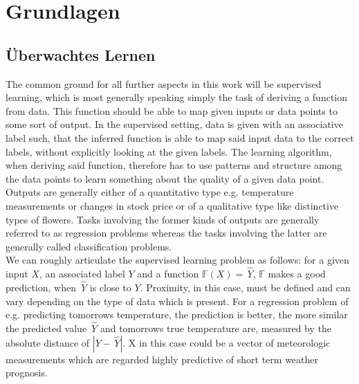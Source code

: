 
\section{Grundlagen}
\subsection{Überwachtes Lernen}
\newcommand\yhat{\,\hat{y}}
\newcommand\Yhat{\, \hat{Y}}

The common ground for all further aspects in this work will be supervised learning, which is most generally speaking simply the task of deriving a function from data. This function should be able to map given inputs or data points to some sort of output. In the supervised setting, data is given with an associative label such, that the inferred function is able to map said input data to the correct labels, without explicitly looking at the given labels. The learning algorithm, when deriving said function, therefore has to use patterns and structure among the data points to learn something about the quality of a given data point. Outputs are generally either of a quantitative type e.g. temperature measurements or changes in stock price or of a qualitative type like distinctive types of flowers. Tasks involving the former kinds of outputs are generally referred to as regression problems whereas the tasks involving the latter are generally called classification problems.
\\We can roughly articulate the supervised learning problem as follows: for a given input $X$, an associated label $Y$ and a function $ \mathbb{F}(X)= \Yhat$, $\mathbb{F}$ makes a good prediction, when $\Yhat$ is close to $Y$. Proximity, in this case, must be defined and can vary depending on the type of data which is present. For a regression problem of e.g. predicting tomorrows temperature, the prediction is better, the more similar the predicted value $\Yhat$ and tomorrows true temperature are, measured by the absolute distance of $|Y-\Yhat|$.
X in this case could be a vector of meteorologic measurements which are regarded highly predictive of short term weather prognosis.
